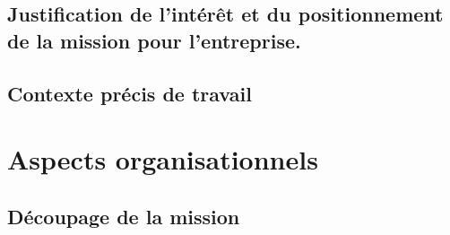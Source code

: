 \documentclass[a4paper, 12pt]{article}
\begin{document}
    
    \newpage{}


\subsection{Justification de l’intérêt et du positionnement de la mission pour l’entreprise.}

    
    \newpage{}

\subsection{Contexte précis de travail}


    
    \newpage{}


\section{Aspects organisationnels}


\subsection{Découpage de la mission}

\end{document}
